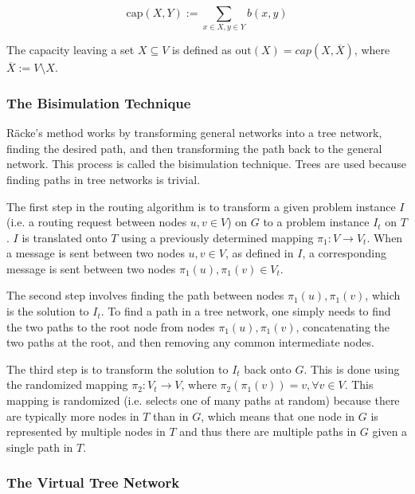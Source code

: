 \[
\textrm{cap}(X,Y):=\sum_{x\in X,y\in Y} b(x,y)
\]
	
The capacity leaving a set $X \subseteq V $  is defined as $\textrm{out}(X)=cap(X,\overline{X}) $, where $\overline{X}:=V\setminus X $.

\subsubsection[The Bisimulation Technique]{The Bisimulation Technique \cite{ref:2003-racke-oblivious_routing}}\label{sec:routing:background:oblivious_routing:bisimulation_technique}

R\"acke's method works by transforming general networks into a tree network, finding the desired path, and then transforming the path back to the general network. This process is called the bisimulation technique. Trees are used because finding paths in tree networks is trivial.
 
The first step in the routing algorithm is to transform a given problem instance $I$ (i.e. a routing request between nodes $u,v\in V $) on $G$ to a problem instance $I_t$ on $T$. $I$ is translated onto $T$ using a previously determined mapping $\pi _1:V\rightarrow V_t $. When a message is sent between two nodes $u,v\in V $, as defined in $I$, a corresponding message is sent between two nodes $\pi _1(u),\pi _1(v)\in V_t $. 

The second step involves finding the path between nodes $\pi _1(u),\pi _1(v)$, which is the solution to $I_t$. To find a path in a tree network, one simply needs to find the two paths to the root node from nodes $\pi _1(u),\pi _1(v)$, concatenating the two paths at the root, and then removing any common intermediate nodes.

The third step is to transform the solution to $I_t$ back onto $G$. This is done using the randomized mapping $\pi _2:V_t\rightarrow V $, where $\pi _2(\pi _1(v))=v, \forall v\in V $. This mapping is randomized (i.e. selects one of many paths at random) because there are typically more nodes in $T$ than in $G$, which means that one node in $G$ is represented by multiple nodes in $T$ and thus there are multiple paths in $G$ given a single path in $T$.

\subsubsection[The Virtual Tree Network]{The Virtual Tree Network \cite{ref:2003-racke-oblivious_routing}}\label{sec:routing:background:oblivious_routing:virtual_tree_network}

